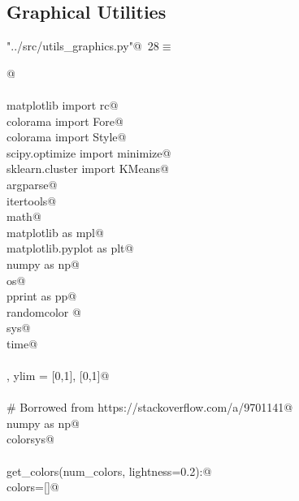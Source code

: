 \documentclass[10.0pt]{report}
\begin{document}
\begin{appendices}
\section{Graphical Utilities}


\begin{flushleft} \small\label{scrap12}\raggedright\small
{} \verb@"../src/utils_graphics.py"@\nobreak\ {\footnotesize {28}}$\equiv$
\vspace{-1ex}
\begin{list}{}{} \item
\mbox{}\verb@    @\\
\mbox{}\verb@@\\
\mbox{}\verb@from matplotlib import rc@\\
\mbox{}\verb@from colorama import Fore@\\
\mbox{}\verb@from colorama import Style@\\
\mbox{}\verb@from scipy.optimize import minimize@\\
\mbox{}\verb@from sklearn.cluster import KMeans@\\
\mbox{}\verb@import argparse@\\
\mbox{}\verb@import itertools@\\
\mbox{}\verb@import math@\\
\mbox{}\verb@import matplotlib as mpl@\\
\mbox{}\verb@import matplotlib.pyplot as plt@\\
\mbox{}\verb@import numpy as np@\\
\mbox{}\verb@import os@\\
\mbox{}\verb@import pprint as pp@\\
\mbox{}\verb@import randomcolor @\\
\mbox{}\verb@import sys@\\
\mbox{}\verb@import time@\\
\mbox{}\verb@@\\
\mbox{}\verb@xlim, ylim = [0,1], [0,1]@\\
\mbox{}\verb@@\\
\mbox{}\verb@# Borrowed from https://stackoverflow.com/a/9701141@\\
\mbox{}\verb@import numpy as np@\\
\mbox{}\verb@import colorsys@\\
\mbox{}\verb@@\\
\mbox{}\verb@def get_colors(num_colors, lightness=0.2):@\\
\mbox{}\verb@    colors=[]@\\

\end{list}
\end{flushleft}
\end{appendices}
\end{document}
